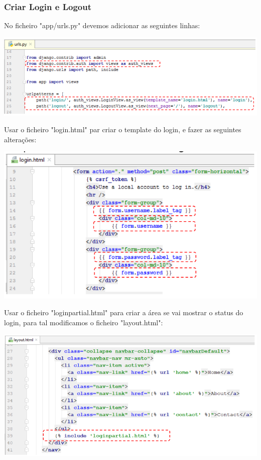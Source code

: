 \documentclass{article}
\begin{document}
\pagebreak

\subsubsection{Criar Login e Logout}

\begin{flushleft}
  No ficheiro "app/urls.py" devemos adicionar as seguintes linhas:

  \begin{center}
    \includegraphics[scale=0.35]{23}
  \end{center}

  Usar o ficheiro "login.html" par criar o template do login, e fazer as seguintes alterações:

  \begin{center}
    \includegraphics[scale=0.35]{24}
  \end{center}

  Usar o ficheiro "loginpartial.html" para criar a área se vai mostrar o status do login, 
  para tal modificamos o ficheiro "layout.html":

  \begin{center}
    \includegraphics[scale=0.35]{25}
  \end{center}
\end{flushleft}
\end{document}
